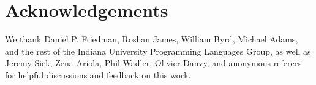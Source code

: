 \documentclass{LMCS}
\theoremstyle{plain}
\theoremstyle{remark}
\begin{document}
\section{Acknowledgements}
We thank Daniel P. Friedman, Roshan James, William Byrd, Michael Adams, and the
rest of the Indiana University Programming Languages Group, as well as Jeremy
Siek, Zena Ariola, Phil Wadler, Olivier Danvy, and anonymous referees for
helpful discussions and feedback on this work.



\end{document}
